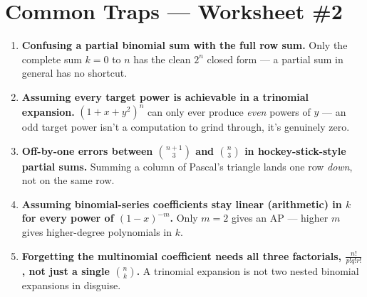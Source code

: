 \documentclass[11pt,a4paper]{article}
\begin{document}
\section*{Common Traps --- Worksheet \#2}
\begin{enumerate}[leftmargin=2em,itemsep=4pt]
  \item \textbf{Confusing a partial binomial sum with the full row sum.} Only the complete sum $k=0$ to $n$ has the clean $2^n$ closed form --- a partial sum in general has no shortcut. 
  \item \textbf{Assuming every target power is achievable in a trinomial expansion.} $(1+x+y^2)^n$ can only ever produce \emph{even} powers of $y$ --- an odd target power isn't a computation to grind through, it's genuinely zero. 
  \item \textbf{Off-by-one errors between $\binom{n+1}3$ and $\binom n3$ in hockey-stick-style partial sums.} Summing a column of Pascal's triangle lands one row \emph{down}, not on the same row. 
  \item \textbf{Assuming binomial-series coefficients stay linear (arithmetic) in $k$ for every power of $(1-x)^{-m}$.} Only $m=2$ gives an AP --- higher $m$ gives higher-degree polynomials in $k$. 
  \item \textbf{Forgetting the multinomial coefficient needs all three factorials, $\frac{n!}{p!q!r!}$, not just a single $\binom nk$.} A trinomial expansion is not two nested binomial expansions in disguise. 
\end{enumerate}

\end{document}
